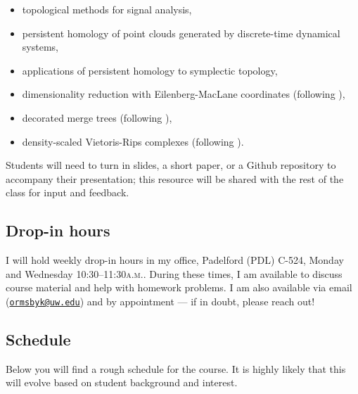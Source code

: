 \documentclass[11pt,twoside]{amsart}
\begin{document}
\begin{itemize}
\item topological methods for signal analysis,
\item persistent homology of point clouds generated by discrete-time dynamical systems,
\item applications of persistent homology to symplectic topology,
\item dimensionality reduction with {E}ilenberg-{M}ac{L}ane coordinates (following \cite{perea}),
\item decorated merge trees (following \cite{dmt}),
\item density-scaled Vietoris-Rips complexes (following \cite{hicock}).
\end{itemize}

\noindent Students will need to turn in slides, a short paper, or a Github repository to accompany their presentation; this resource will be shared with the rest of the class for input and feedback.

\subsection*{Drop-in hours}
I will hold weekly drop-in hours in my office, Padelford (PDL) C-524, Monday and Wednesday 10:30--11:30\textsc{a.m.}. During these times, I am available to discuss course material and help with homework problems. I am also available via email (\href{mailto:ormsbyk@uw.edu}{\nolinkurl{ormsbyk@uw.edu}}) and by appointment --- if in doubt, please reach out!

\subsection*{Schedule}
Below you will find a rough schedule for the course. It is highly likely that this will evolve based on student background and interest.
\end{document}
